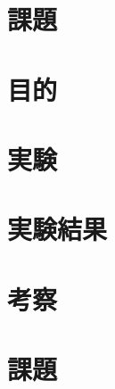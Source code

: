 \documentclass[uplatex, 11pt,a4j, titlepage]{jsarticle}
\begin{document}
\section{課題}


\newpage



\subtitle{2020/11/6}

\section{目的}
\section{実験}
\section{実験結果}
\section{考察}
\section{課題}


\newpage
\thispagestyle{empty}
\nocite{Material}


\end{document}
